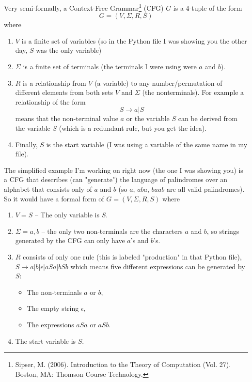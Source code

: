 \documentclass[•]{article}
\begin{document}
Very semi-formally, a Context-Free Grammar\footnote{Sipser, M. (2006). Introduction to the Theory of Computation (Vol. 27). Boston, MA: Thomson Course Technology.} (CFG) $G$ is a 4-tuple of the form
\begin{equation}
	G=(V,\Sigma,R,S)
\end{equation}
where
\begin{enumerate}
	\item $V$ is a finite set of variables (so in the Python file I was showing you the other day, $S$ was the only variable)
	\item $\Sigma$ is a finite set of terminals (the terminals I were using were $a$ and $b$).
	\item $R$ is a relationship from $V$ (a variable) to any number/permutation of different elements from both sets $V$ and $\Sigma$ (the nonterminals). For example a relationship of the form
	\begin{equation}
	S \rightarrow a | S
	\end{equation}
means that the non-terminal value $a$ or the variable $S$ can be derived from the variable $S$ (which is a redundant rule, but you get the idea).
	\item Finally, $S$ is the start variable (I was using a variable of the same name in my file).
\end{enumerate}

The simplified example I'm working on right now (the one I was showing you) is a CFG that describes (can "generate") the language of palindromes over an alphabet that consists only of $a$ and $b$ (so $a$, $aba$, $baab$ are all valid palindromes). So it would have a formal form of $G=(V,\Sigma,R,S)$ where
\begin{enumerate}
	\item $V={S}$ -- The only variable is $S$.
	\item $\Sigma={a,b}$ -- the only two non-terminals are the characters $a$ and $b$, so strings generated by the CFG can only have $a$'s and $b$'s.
	\item $R$ consists of only one rule (this is labeled "production" in that Python file), $S \rightarrow a | b | \epsilon | aSa | bSb$ which means five different expressions can be generated by $S$:
	\begin{itemize}
		\item The non-terminals $a$ or $b$,
		\item The empty string $\epsilon$,
		\item The expressions $aSa$ or $aSb$.
	\end{itemize}
	\item The start variable is $S$.
\end{enumerate}
\end{document}
